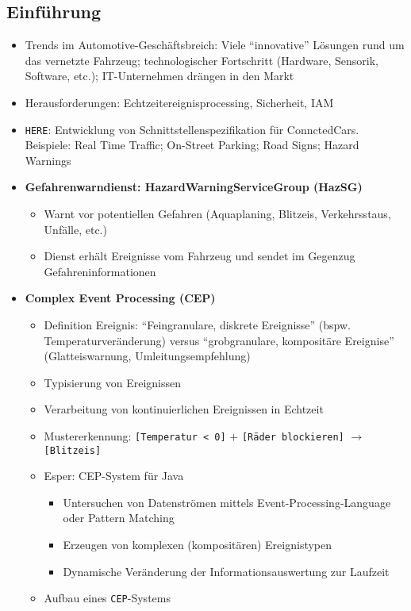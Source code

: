 \subsection{Einführung}
\begin{itemize}
	\item Trends im Automotive-Geschäftsbreich: Viele "`innovative"' Lösungen rund um das vernetzte Fahrzeug; technologischer Fortschritt (Hardware, Sensorik, Software, etc.); IT-Unternehmen drängen in den Markt
	\item Herausforderungen: Echtzeitereignisprocessing, Sicherheit, IAM
	\item \texttt{HERE}: Entwicklung von Schnittstellenspezifikation für ConnctedCars. Beispiele: Real Time Traffic; On-Street Parking; Road Signs; Hazard Warnings
	\item \textbf{Gefahrenwarndienst: HazardWarningServiceGroup (HazSG)}
	\begin{itemize}
		\item Warnt vor potentiellen Gefahren (Aquaplaning, Blitzeis, Verkehrsstaus, Unfälle, etc.)
		\item Dienst erhält Ereignisse vom Fahrzeug und sendet im Gegenzug Gefahreninformationen
	\end{itemize}
	\item \textbf{Complex Event Processing (CEP)}
	\begin{itemize}
		\item Definition Ereignis: "`Feingranulare, diskrete Ereignisse"' (bspw. Temperaturveränderung) versus "`grobgranulare, kompositäre Ereignise"' (Glatteiswarnung, Umleitungsempfehlung)
		\item Typisierung von Ereignissen
		\item Verarbeitung von kontinuierlichen Ereignissen in Echtzeit
		\item Mustererkennung: \texttt{[Temperatur < 0]} \(+\) \texttt{[Räder blockieren]} \(\rightarrow\) \texttt{[Blitzeis]}
		\item Esper: CEP-System für Java
		\begin{itemize}
			\item Untersuchen von Datenströmen mittels Event-Processing-Language oder Pattern Matching
			\item Erzeugen von komplexen (kompositären) Ereignistypen
			\item Dynamische Veränderung der Informationsauswertung zur Laufzeit
		\end{itemize}
		\item Aufbau eines \texttt{CEP}-Systems

\end{itemize}
\end{itemize}
